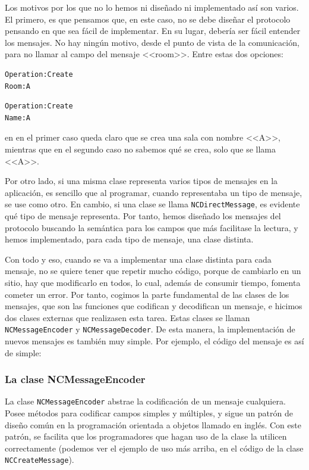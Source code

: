 Los motivos por los que no lo hemos ni diseñado ni implementado así son varios. El primero, es que pensamos que, en este caso, no se debe diseñar el protocolo pensando en que sea fácil de implementar. En su lugar, debería ser fácil entender los mensajes. No hay ningún motivo, desde el punto de vista de la comunicación, para no llamar al campo del mensaje  <<room>>. Entre estas dos opciones:

\begin{multicols}{2}
\begin{lstlisting}
Operation:Create
Room:A

\end{lstlisting}
     \columnbreak
\begin{lstlisting}
Operation:Create
Name:A

\end{lstlisting}
\end{multicols}

en en el primer caso queda claro que se crea una sala con nombre <<A>>, mientras que en el segundo caso no sabemos qué se crea, solo que se llama <<A>>.

Por otro lado, si una misma clase representa varios tipos de mensajes en la aplicación, es sencillo que al programar, cuando representaba un tipo de mensaje, se use como otro. En cambio, si una clase se llama \lstinline!NCDirectMessage!, es evidente qué tipo de mensaje representa. Por tanto, hemos diseñado los mensajes del protocolo buscando la semántica para los campos que más facilitase la lectura, y hemos implementado, para cada tipo de mensaje, una clase distinta.

Con todo y eso, cuando se va a implementar una clase distinta para cada mensaje, no se quiere tener que repetir mucho código, porque de cambiarlo en un sitio, hay que modificarlo en todos, lo cual, además de consumir tiempo, fomenta cometer un error. Por tanto, cogimos la parte fundamental de las clases de los mensajes, que son las funciones que codifican y decodifican un mensaje, e hicimos dos clases externas que realizasen esta tarea. Estas clases se llaman \lstinline!NCMessageEncoder! y \lstinline!NCMessageDecoder!. De esta manera, la implementación de nuevos mensajes es también muy simple. Por ejemplo, el código del mensaje  es así de simple:



\subsubsection*{La clase NCMessageEncoder}
La clase \lstinline{NCMessageEncoder} abstrae la codificación de un mensaje  cualquiera. Posee métodos para codificar campos simples y múltiples, y sigue un patrón de diseño común en la programación orientada a objetos llamado  en inglés. Con este patrón, se facilita que los programadores que hagan uso de la clase la utilicen correctamente (podemos ver el ejemplo de uso más arriba, en el código de la clase \lstinline!NCCreateMessage!).

